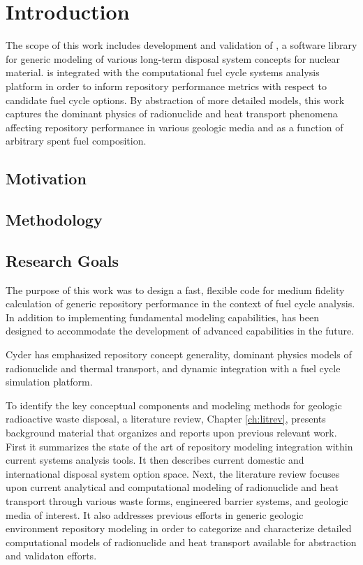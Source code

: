 \chapter{Introduction}\label{ch:introduction}


The scope of this work includes development and validation of \Cyder, a software 
library for generic modeling of various long-term disposal system concepts for 
nuclear material. \Cyder is integrated with the \Cyclus computational fuel cycle 
systems analysis platform in order to inform repository performance metrics with 
respect to candidate fuel cycle options.  By abstraction of more detailed 
models, this work captures the dominant physics of radionuclide and heat 
transport phenomena affecting repository performance in various geologic media 
and as a function of arbitrary spent fuel composition. 

\section{Motivation} 


\section{Methodology} 


\section{Research Goals}

The purpose of this work was to design a fast, flexible code for medium fidelity 
calculation of generic repository performance in the context of fuel cycle 
analysis. In addition to implementing fundamental modeling capabilities, \Cyder 
has been designed to accommodate the development of advanced capabilities in the 
future.

Cyder has emphasized repository concept generality, dominant physics models of 
radionuclide and thermal transport, and dynamic integration with a fuel cycle 
simulation platform.


To identify the key conceptual components and modeling methods for geologic 
radioactive waste disposal, a literature review, Chapter \ref{ch:litrev}, 
presents background material that organizes and reports upon previous relevant 
work. First it summarizes the state of the art of repository modeling 
integration within current systems analysis tools. It then describes current 
domestic and international disposal system option space.  Next, the literature 
review focuses upon current analytical and computational modeling of 
radionuclide and heat transport through various waste forms, engineered barrier 
systems, and geologic media of interest.  It also addresses previous efforts in 
generic geologic environment repository modeling in order to categorize and 
characterize detailed computational models of radionuclide and heat transport 
available for abstraction and validaton efforts.

